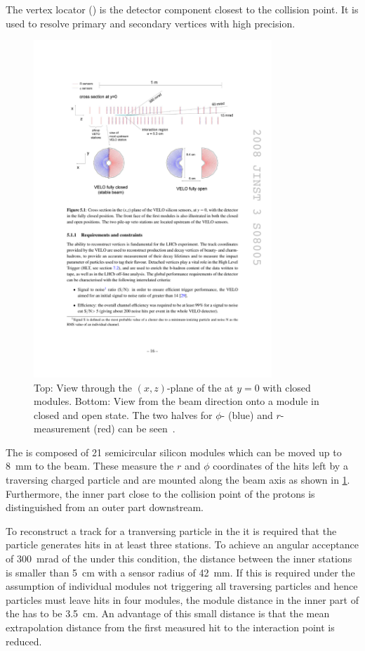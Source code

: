 The vertex locator (\velo) is the detector component closest to the collision point.
It is used to resolve primary and secondary vertices with high precision.
\begin{figure}[tbp]
    \centering
    \includegraphics[width=0.8\textwidth]{05lhcb/figs/velo.pdf}
    \caption{Top: View through the $(x,z)$-plane of the \velo at $y=0$ with closed modules.
    Bottom: View from the beam direction onto a module in closed and open state.
    The two halves for $\phi$- (blue) and $r$-measurement (red) can be seen~\cite{Alves:2008zz}.}
    \label{fig:velo}
\end{figure}
The \velo is composed of \num{21} semicircular silicon modules which can be moved up to \SI{8}{\milli\metre} to the beam.
These measure the $r$ and $\phi$ coordinates of the hits left by a traversing charged particle and are mounted along the beam axis as shown in \cref{fig:velo}.
Furthermore, the inner part close to the collision point of the protons is distinguished from an outer part downstream.

To reconstruct a track for a tranversing particle in the \velo it is required that the particle generates hits in at least three stations.
To achieve an angular acceptance of \SI{300}{\milli\radian} of the \velo under this condition, the distance between the inner stations is smaller than \SI{5}{\centi\metre} with a sensor radius of \SI{42}{\milli\metre}.
If this is required under the assumption of individual modules not triggering all traversing particles and hence particles must leave hits in four modules, the module distance in the inner part of the \velo has to be \SI{3.5}{\centi\metre}.
An advantage of this small distance is that the mean extrapolation distance from the first measured hit to the interaction point is reduced.

